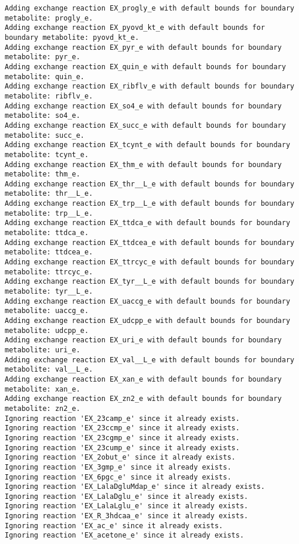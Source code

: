 \documentclass[
  letterpaper,
  DIV=11,
  numbers=noendperiod]{scrartcl}
\begin{document}
\begin{verbatim}
Adding exchange reaction EX_progly_e with default bounds for boundary metabolite: progly_e.
Adding exchange reaction EX_pyovd_kt_e with default bounds for boundary metabolite: pyovd_kt_e.
Adding exchange reaction EX_pyr_e with default bounds for boundary metabolite: pyr_e.
Adding exchange reaction EX_quin_e with default bounds for boundary metabolite: quin_e.
Adding exchange reaction EX_ribflv_e with default bounds for boundary metabolite: ribflv_e.
Adding exchange reaction EX_so4_e with default bounds for boundary metabolite: so4_e.
Adding exchange reaction EX_succ_e with default bounds for boundary metabolite: succ_e.
Adding exchange reaction EX_tcynt_e with default bounds for boundary metabolite: tcynt_e.
Adding exchange reaction EX_thm_e with default bounds for boundary metabolite: thm_e.
Adding exchange reaction EX_thr__L_e with default bounds for boundary metabolite: thr__L_e.
Adding exchange reaction EX_trp__L_e with default bounds for boundary metabolite: trp__L_e.
Adding exchange reaction EX_ttdca_e with default bounds for boundary metabolite: ttdca_e.
Adding exchange reaction EX_ttdcea_e with default bounds for boundary metabolite: ttdcea_e.
Adding exchange reaction EX_ttrcyc_e with default bounds for boundary metabolite: ttrcyc_e.
Adding exchange reaction EX_tyr__L_e with default bounds for boundary metabolite: tyr__L_e.
Adding exchange reaction EX_uaccg_e with default bounds for boundary metabolite: uaccg_e.
Adding exchange reaction EX_udcpp_e with default bounds for boundary metabolite: udcpp_e.
Adding exchange reaction EX_uri_e with default bounds for boundary metabolite: uri_e.
Adding exchange reaction EX_val__L_e with default bounds for boundary metabolite: val__L_e.
Adding exchange reaction EX_xan_e with default bounds for boundary metabolite: xan_e.
Adding exchange reaction EX_zn2_e with default bounds for boundary metabolite: zn2_e.
Ignoring reaction 'EX_23camp_e' since it already exists.
Ignoring reaction 'EX_23ccmp_e' since it already exists.
Ignoring reaction 'EX_23cgmp_e' since it already exists.
Ignoring reaction 'EX_23cump_e' since it already exists.
Ignoring reaction 'EX_2obut_e' since it already exists.
Ignoring reaction 'EX_3gmp_e' since it already exists.
Ignoring reaction 'EX_6pgc_e' since it already exists.
Ignoring reaction 'EX_LalaDgluMdap_e' since it already exists.
Ignoring reaction 'EX_LalaDglu_e' since it already exists.
Ignoring reaction 'EX_LalaLglu_e' since it already exists.
Ignoring reaction 'EX_R_3hdcaa_e' since it already exists.
Ignoring reaction 'EX_ac_e' since it already exists.
Ignoring reaction 'EX_acetone_e' since it already exists.

\end{verbatim}
\end{document}
